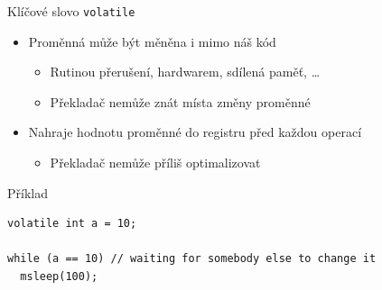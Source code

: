 \begin{frame}[fragile]{Klíčové slovo \texttt{volatile}}

  \begin{itemize}
    \item Proměnná může být měněna i mimo náš kód
    \begin{itemize}
      \item Rutinou přerušení, hardwarem, sdílená paměť, \dots
      \item Překladač nemůže znát místa změny proměnné
    \end{itemize}

    \pause

    \item Nahraje hodnotu proměnné do registru před každou operací
    \begin{itemize}
      \item Překladač nemůže příliš optimalizovat
    \end{itemize}

  \end{itemize}


\begin{block}{Příklad}
\begin{lstlisting}
volatile int a = 10;

while (a == 10) // waiting for somebody else to change it
  msleep(100);
\end{lstlisting}
\end{block}

\end{frame}

